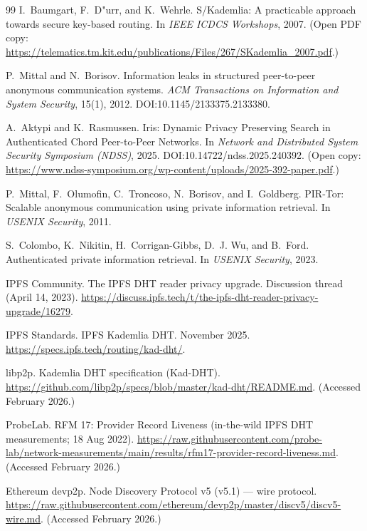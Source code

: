 \documentclass[11pt]{article}
\begin{document}
\begin{thebibliography}{99}
I.~Baumgart, F.~D{"u}rr, and K.~Wehrle.
\newblock S/Kademlia: A practicable approach towards secure key-based routing.
\newblock In \emph{IEEE ICDCS Workshops}, 2007.
\newblock (Open PDF copy: \url{https://telematics.tm.kit.edu/publications/Files/267/SKademlia_2007.pdf}.)

P.~Mittal and N.~Borisov.
\newblock Information leaks in structured peer-to-peer anonymous communication systems.
\newblock \emph{ACM Transactions on Information and System Security}, 15(1), 2012.
\newblock DOI:10.1145/2133375.2133380.

A.~Aktypi and K.~Rasmussen.
\newblock Iris: Dynamic Privacy Preserving Search in Authenticated Chord Peer-to-Peer Networks.
\newblock In \emph{Network and Distributed System Security Symposium (NDSS)}, 2025.
\newblock DOI:10.14722/ndss.2025.240392. (Open copy: \url{https://www.ndss-symposium.org/wp-content/uploads/2025-392-paper.pdf}.)

P.~Mittal, F.~Olumofin, C.~Troncoso, N.~Borisov, and I.~Goldberg.
\newblock PIR-Tor: Scalable anonymous communication using private information retrieval.
\newblock In \emph{USENIX Security}, 2011.

S.~Colombo, K.~Nikitin, H.~Corrigan-Gibbs, D.~J. Wu, and B.~Ford.
\newblock Authenticated private information retrieval.
\newblock In \emph{USENIX Security}, 2023.


IPFS Community.
\newblock The IPFS DHT reader privacy upgrade.
\newblock Discussion thread (April 14, 2023). \url{https://discuss.ipfs.tech/t/the-ipfs-dht-reader-privacy-upgrade/16279}.

IPFS Standards.
\newblock IPFS Kademlia DHT.
 November 2025. \url{https://specs.ipfs.tech/routing/kad-dht/}.

libp2p.
\newblock Kademlia DHT specification (Kad-DHT).
\newblock \url{https://github.com/libp2p/specs/blob/master/kad-dht/README.md}. (Accessed February 2026.)

ProbeLab.
\newblock RFM 17: Provider Record Liveness (in-the-wild IPFS DHT measurements; 18 Aug 2022).
\newblock \url{https://raw.githubusercontent.com/probe-lab/network-measurements/main/results/rfm17-provider-record-liveness.md}. (Accessed February 2026.)

Ethereum devp2p.
\newblock Node Discovery Protocol v5 (v5.1) --- wire protocol.
\newblock \url{https://raw.githubusercontent.com/ethereum/devp2p/master/discv5/discv5-wire.md}. (Accessed February 2026.)


\end{thebibliography}
\end{document}
